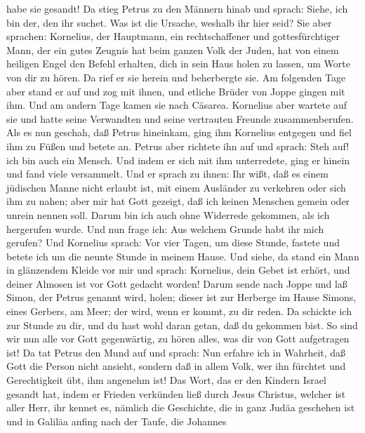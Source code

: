 habe sie gesandt!  Da stieg Petrus zu den Männern hinab
und sprach: Siehe, ich bin der, den ihr suchet. Was ist die Ursache,
weshalb ihr hier seid?  Sie aber sprachen: Kornelius, der
Hauptmann, ein rechtschaffener und gottesfürchtiger Mann, der ein gutes
Zeugnis hat beim ganzen Volk der Juden, hat von einem heiligen Engel den
Befehl erhalten, dich in sein Haus holen zu lassen, um Worte von dir zu
hören.  Da rief er sie herein und beherbergte sie. Am
folgenden Tage aber stand er auf und zog mit ihnen, und etliche Brüder
von Joppe gingen mit ihm.  Und am andern Tage kamen sie
nach Cäsarea. Kornelius aber wartete auf sie und hatte seine Verwandten
und seine vertrauten Freunde zusammenberufen.  Als es nun
geschah, daß Petrus hineinkam, ging ihm Kornelius entgegen und fiel ihm
zu Füßen und betete an.  Petrus aber richtete ihn auf und
sprach: Steh auf! ich bin auch ein Mensch.  Und indem er
sich mit ihm unterredete, ging er hinein und fand viele versammelt.
 Und er sprach zu ihnen: Ihr wißt, daß es einem jüdischen
Manne nicht erlaubt ist, mit einem Ausländer zu verkehren oder sich ihm
zu nahen; aber mir hat Gott gezeigt, daß ich keinen Menschen gemein oder
unrein nennen soll.  Darum bin ich auch ohne Widerrede
gekommen, als ich hergerufen wurde. Und nun frage ich: Aus welchem
Grunde habt ihr mich gerufen?  Und Kornelius sprach: Vor
vier Tagen, um diese Stunde, fastete und betete ich um die neunte Stunde
in meinem Hause. Und siehe, da stand ein Mann in glänzendem Kleide vor
mir und sprach:  Kornelius, dein Gebet ist erhört, und
deiner Almosen ist vor Gott gedacht worden!  Darum sende
nach Joppe und laß Simon, der Petrus genannt wird, holen; dieser ist zur
Herberge im Hause Simons, eines Gerbers, am Meer; der wird, wenn er
kommt, zu dir reden.  Da schickte ich zur Stunde zu dir,
und du hast wohl daran getan, daß du gekommen bist. So sind wir nun alle
vor Gott gegenwärtig, zu hören alles, was dir von Gott aufgetragen ist!
 Da tat Petrus den Mund auf und sprach: Nun erfahre ich
in Wahrheit, daß Gott die Person nicht ansieht,  sondern
daß in allem Volk, wer ihn fürchtet und Gerechtigkeit übt, ihm angenehm
ist!  Das Wort, das er den Kindern Israel gesandt hat,
indem er Frieden verkünden ließ durch Jesus Christus, welcher ist aller
Herr,  ihr kennet es, nämlich die Geschichte, die in ganz
Judäa geschehen ist und in Galiläa anfing nach der Taufe, die Johannes
